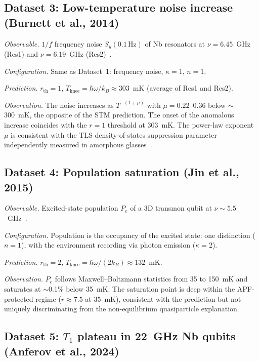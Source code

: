 \documentclass[11pt]{article}
\begin{document}
\subsection{Dataset 3: Low-temperature noise increase (Burnett et al., 2014)}

\textit{Observable.}  $1/f$ frequency noise $S_y(0.1\,\mathrm{Hz})$ of Nb resonators at $\nu = 6.45$~GHz (Res1) and $\nu = 6.19$~GHz (Res2)~\cite{Burnett2014}.

\textit{Configuration.}  Same as Dataset~1: frequency noise, $\kappa = 1$, $n = 1$.

\textit{Prediction.}  $r_{\mathrm{th}} = 1$, $T_{\mathrm{knee}} = \hbar\omega / k_B \approx 303$~mK (average of Res1 and Res2).

\textit{Observation.}  The noise increases as $T^{-(1+\mu)}$ with $\mu = 0.22$--$0.36$ below $\sim$300~mK, the opposite of the STM prediction.  The onset of the anomalous increase coincides with the $r = 1$ threshold at 303~mK.  The power-law exponent $\mu$ is consistent with the TLS density-of-states suppression parameter independently measured in amorphous glasses~\cite{Burnett2016}.

\subsection{Dataset 4: Population saturation (Jin et al., 2015)}

\textit{Observable.}  Excited-state population $P_e$ of a 3D transmon qubit at $\nu \sim 5.5$~GHz~\cite{Jin2015}.

\textit{Configuration.}  Population is the occupancy of the excited state: one distinction ($n = 1$), with the environment recording via photon emission ($\kappa = 2$).

\textit{Prediction.}  $r_{\mathrm{th}} = 2$, $T_{\mathrm{knee}} = \hbar\omega / (2k_B) \approx 132$~mK.

\textit{Observation.}  $P_e$ follows Maxwell--Boltzmann statistics from 35 to 150~mK and saturates at $\sim$0.1\% below 35~mK.  The saturation point is deep within the APF-protected regime ($r \approx 7.5$ at 35~mK), consistent with the prediction but not uniquely discriminating from the non-equilibrium quasiparticle explanation.

\subsection{Dataset 5: $T_1$ plateau in 22~GHz Nb qubits (Anferov et al., 2024)}
\end{document}
